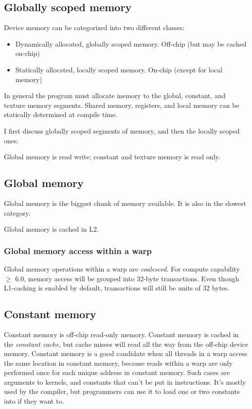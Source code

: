 \documentclass[a4paper,titlepage,12pt]{article}
\begin{document}
\begin{description}[left = \parindent]
\section{Globally scoped memory}

Device memory can be categorized into two different classes:
\begin{itemize}
	\item Dynamically allocated, globally scoped memory. Off-chip (but may be cached on-chip)
	\item Statically allocated, locally scoped memory. On-chip (except for local memory)
\end{itemize}

In general the program must allocate memory to the global, constant, and texture memory segments.
Shared memory, registers, and local memory can be statically determined at compile time.

I first discuss globally scoped segments of memory, and then the locally scoped ones.

Global memory is read write; constant and texture memory is read only.


\subsection{Global memory}

Global memory is the biggest chunk of memory available.
It is also in the slowest category.

Global memory is cached in L2.

\subsubsection{Global memory access within a warp}

\label{sssec:gmem_warp}

Global memory operations within a warp are {\em coalesced}. %
For compute capability \(\geq\) 6.0, memory access will be grouped into 32-byte transactions. Even though L1-caching is enabled by default, transactions will still be units of 32 bytes.

\subsection{Constant memory}

Constant memory is off-chip read-only memory.
Constant memory is cached in the {\em constant cache}, but cache misses will read all the way from the off-chip device memory.
Constant memory is a good candidate when all threads in a warp access the same location in constant memory, because reads within a warp are only performed once for each unique address in constant memory.
Such cases are arguments to kernels, and constants that can't be put in instructions.
It's mostly used by the compiler, but programmers can use it to load one or two constants into if they want to.


\end{description}
\end{document}
